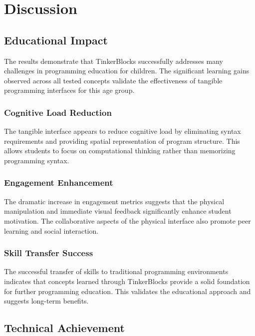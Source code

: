 \section{Discussion}

\subsection{Educational Impact}

The results demonstrate that TinkerBlocks successfully addresses many challenges in programming education for children. The significant learning gains observed across all tested concepts validate the effectiveness of tangible programming interfaces for this age group.

\subsubsection{Cognitive Load Reduction}

The tangible interface appears to reduce cognitive load by eliminating syntax requirements and providing spatial representation of program structure. This allows students to focus on computational thinking rather than memorizing programming syntax.

\subsubsection{Engagement Enhancement}

The dramatic increase in engagement metrics suggests that the physical manipulation and immediate visual feedback significantly enhance student motivation. The collaborative aspects of the physical interface also promote peer learning and social interaction.

\subsubsection{Skill Transfer Success}

The successful transfer of skills to traditional programming environments indicates that concepts learned through TinkerBlocks provide a solid foundation for further programming education. This validates the educational approach and suggests long-term benefits.

\subsection{Technical Achievement}

